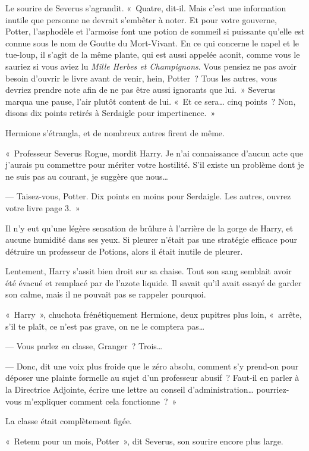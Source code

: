 Le sourire de Severus s'agrandit. «~Quatre, dit-il. Mais c'est une information inutile que personne ne devrait s'embêter à noter. Et pour votre gouverne, Potter, l'asphodèle et l'armoise font une potion de sommeil si puissante qu'elle est connue sous le nom de Goutte du Mort-Vivant. En ce qui concerne le napel et le tue-loup, il s'agit de la même plante, qui est aussi appelée aconit, comme vous le sauriez si vous aviez lu \emph{Mille Herbes et Champignons}. Vous pensiez ne pas avoir besoin d'ouvrir le livre avant de venir, hein, Potter~? Tous les autres, vous devriez prendre note afin de ne pas être aussi ignorants que lui.~» Severus marqua une pause, l'air plutôt content de lui. «~Et ce sera… cinq points~? Non, disons dix points retirés à Serdaigle pour impertinence.~»

Hermione s'étrangla, et de nombreux autres firent de même.

«~Professeur Severus Rogue, mordit Harry. Je n'ai connaissance d'aucun acte que j'aurais pu commettre pour mériter votre hostilité. S'il existe un problème dont je ne suis pas au courant, je suggère que nous…

--- Taisez-vous, Potter. Dix points en moins pour Serdaigle. Les autres, ouvrez votre livre page 3.~»

Il n'y eut qu'une légère sensation de brûlure à l'arrière de la gorge de Harry, et aucune humidité dans ses yeux. Si pleurer n'était pas une stratégie efficace pour détruire un professeur de Potions, alors il était inutile de pleurer.

Lentement, Harry s'assit bien droit sur sa chaise. Tout son sang semblait avoir été évacué et remplacé par de l'azote liquide. Il savait qu'il avait essayé de garder son calme, mais il ne pouvait pas se rappeler pourquoi.

«~Harry~», chuchota frénétiquement Hermione, deux pupitres plus loin, «~arrête, s'il te plaît, ce n'est pas grave, on ne le comptera pas…

--- Vous parlez en classe, Granger~? Trois…

--- Donc, dit une voix plus froide que le zéro absolu, comment s'y prend-on pour déposer une plainte formelle au sujet d'un professeur abusif~? Faut-il en parler à la Directrice Adjointe, écrire une lettre au conseil d'administration… pourriez-vous m'expliquer comment cela fonctionne~?~»

La classe était complètement figée.

«~Retenu pour un mois, Potter~», dit Severus, son sourire encore plus large.

